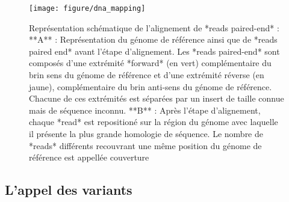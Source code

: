 \documentclass[12pt,twoside]{reedthesis}
\theoremstyle{definition}
\theoremstyle{definition}
\theoremstyle{remark}
\begin{document}
  \begin{figure}
  
  {\centering \texttt{[image: figure/dna\_mapping]} 
  
  }
  
  \caption[Représentation schématique de l'alignement de *reads paired-end*]{Représentation schématique de l'alignement de *reads paired-end* : **A** : Représentation du génome de référence ainsi que de *reads paired end* avant l'étape d'alignement. Les *reads paired-end* sont composés d'une extrémité *forward* (en vert) complémentaire du brin sens du génome de référence et d'une extrémité réverse (en jaune), complémentaire du brin anti-sens du génome de référence. Chacune de ces extrémités est séparées par un insert de taille connue mais de séquence inconnu. **B** : Après l'étape d'alignement, chaque *read* est repositioné sur la région du génome avec laquelle il présente la plus grande homologie de séquence. Le nombre de *reads* différents recouvrant une même position du génome de référence est appellée couverture}\label{fig:picdnamapping}
  \end{figure}
  
  \newpage
  
  \hypertarget{varcall}{\subsection{L'appel des variants}\label{varcall}}
  
\end{document}
